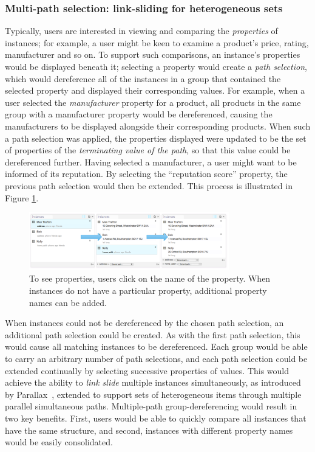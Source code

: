 \documentclass{sigchi}
\begin{document}
\subsubsection{Multi-path selection: link-sliding for heterogeneous sets}
Typically, users are interested in viewing and comparing the \emph{properties} of instances; for example, a user might be keen to examine a product's price, rating, manufacturer and so on.  To support such comparisons, an instance's properties would be displayed beneath it; selecting a property would create a \emph{path selection}, which would dereference all of the instances in a group that contained the selected property and displayed their corresponding values.  For example, when a user selected the \emph{manufacturer} property for a product, all products in the same group with a manufacturer property would be dereferenced, causing the manufacturers to be displayed alongside their corresponding products.  When such a path selection was applied, the properties displayed were updated to be the set of properties of the \emph{terminating value of the path}, so that this value could be dereferenced further.  Having selected a manufacturer, a user might want to be informed of its reputation.  By selecting the ``reputation score'' property, the previous path selection would then be extended. This process is illustrated in Figure \ref{fig:multipathing}.

\begin{figure}[h]
\begin{center}
\includegraphics[width=8.7cm]{img/multipathing}
\caption{To see properties, users click on the name of the property. When instances do not have a particular property, additional property names can be added.}
\label{fig:multipathing}
\end{center}
\end{figure}

When instances could not be dereferenced by the chosen path selection, an additional path selection could be created. As with the first path selection, this would cause all matching instances to be dereferenced.  Each group would be able to carry an arbitrary number of path selections, and each path selection could be extended continually by selecting successive properties of values. This would achieve the ability to \emph{link slide} multiple instances simultaneously, as introduced by Parallax~\cite{parallax}, extended to support sets of heterogeneous items through multiple parallel simultaneous paths.  Multiple-path group-dereferencing would result in two key benefits. First, users would be able to quickly compare all instances that have the same structure, and second, instances with different property names would be easily consolidated.
\end{document}
